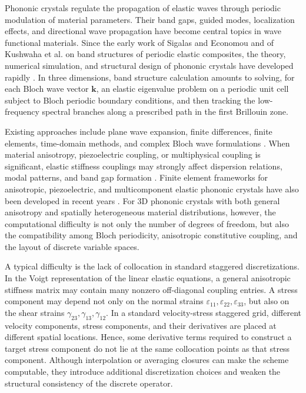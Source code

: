 \documentclass[11pt,oneside]{article}
\numberwithin{equation}{section}
\theoremstyle{plain}
\theoremstyle{remark}
\newcommand{\bk}{\bm{k}}
\begin{document}
Phononic crystals regulate the propagation of elastic waves through periodic modulation of material parameters. Their band gaps, guided modes, localization effects, and directional wave propagation have become central topics in wave functional materials. Since the early work of Sigalas and Economou and of Kushwaha et al. on band structures of periodic elastic composites, the theory, numerical simulation, and structural design of phononic crystals have developed rapidly \cite{SigalasEconomou1992,Kushwaha1993,Hussein2014}. In three dimensions, band structure calculation amounts to solving, for each Bloch wave vector \(\bk\), an elastic eigenvalue problem on a periodic unit cell subject to Bloch periodic boundary conditions, and then tracking the low-frequency spectral branches along a prescribed path in the first Brillouin zone.

Existing approaches include plane wave expansion, finite differences, finite elements, time-domain methods, and complex Bloch wave formulations \cite{SigalasEconomou1992,Kushwaha1993,Laude2009,LyuTianLiLin2024JSC}. When material anisotropy, piezoelectric coupling, or multiphysical coupling is significant, elastic stiffness couplings may strongly affect dispersion relations, modal patterns, and band gap formation \cite{Wu2004PRB,WuHsuHuang2005}. Finite element frameworks for anisotropic, piezoelectric, and multicomponent elastic phononic crystals have also been developed in recent years \cite{Wang2021APM,Yan2025JCP}. For 3D phononic crystals with both general anisotropy and spatially heterogeneous material distributions, however, the computational difficulty is not only the number of degrees of freedom, but also the compatibility among Bloch periodicity, anisotropic constitutive coupling, and the layout of discrete variable spaces.

A typical difficulty is the lack of collocation in standard staggered discretizations. In the Voigt representation of the linear elastic equations, a general anisotropic stiffness matrix may contain many nonzero off-diagonal coupling entries. A stress component may depend not only on the normal strains \(\varepsilon_{11},\varepsilon_{22},\varepsilon_{33}\), but also on the shear strains \(\gamma_{23},\gamma_{13},\gamma_{12}\). In a standard velocity-stress staggered grid, different velocity components, stress components, and their derivatives are placed at different spatial locations. Hence, some derivative terms required to construct a target stress component do not lie at the same collocation points as that stress component. Although interpolation or averaging closures can make the scheme computable, they introduce additional discretization choices and weaken the structural consistency of the discrete operator.
\end{document}
